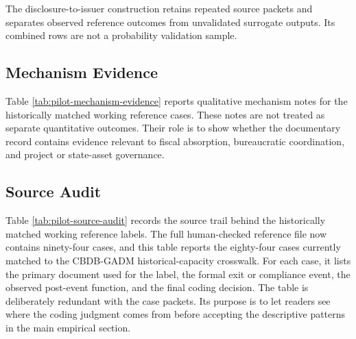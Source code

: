 The disclosure-to-issuer construction retains repeated source packets and
separates observed reference outcomes from unvalidated surrogate outputs.
Its combined rows are not a probability validation sample.



\subsection{Mechanism Evidence}

Table \ref{tab:pilot-mechanism-evidence} reports qualitative mechanism notes
for the historically matched working reference cases. These notes are not treated as
separate quantitative outcomes. Their role is to show whether the
documentary record contains evidence relevant to fiscal absorption,
bureaucratic coordination, and project or state-asset governance.



\subsection{Source Audit}

Table \ref{tab:pilot-source-audit} records the source trail behind the
historically matched working reference labels. The full human-checked reference file now
contains ninety-four cases, and this table reports the eighty-four cases currently
matched to the CBDB-GADM historical-capacity crosswalk. For each case, it
lists the primary document used for the label, the formal exit or compliance event, the observed
post-event function, and the final coding decision. The table is deliberately
redundant with the case packets. Its purpose is to let readers see where the
coding judgment comes from before accepting the descriptive patterns in the
main empirical section.


